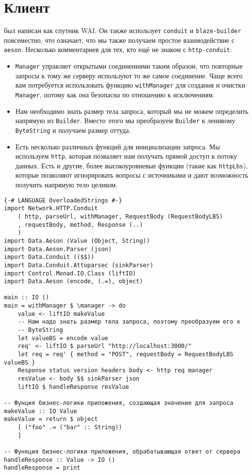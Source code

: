 \section {Клиент}

 был написан как спутник WAI. Он также использует \lstinline!conduit! и \lstinline!blaze-builder! повсеместно, что означает, что мы также получаем простое взаимодействие с \lstinline!aeson!. Несколько комментариев для тех, кто ещё не знаком с \lstinline!http-conduit!:

\begin{itemize}
  \item \lstinline!Manager! управляет открытыми соединениями таким образом, что повторные запросы к тому же серверу используют то же самое соединение. Чаще всего вам потребуется использовать функцию \lstinline!withManager! для создания и очистки \lstinline!Manager!, потому как она безопасна по отношению к исключениям.
  \item Нам необходимо знать размер тела запроса, который мы не можем определить напрямую из \lstinline!Builder!. Вместо этого мы преобразуем \lstinline!Builder! к ленивому \lstinline!ByteString! и получаем размер оттуда.
  \item Есть несколько различных функций для инициализации запроса. Мы используем \lstinline!http!, которая позваляет нам получать прямой доступ к потоку данных. Есть и другие, более высокоуровневые функции (такие как \lstinline!httpLbs!), которые позволяют игнорировать вопросы с источниками и дают возможность получить напрямую тело целиком.
\end{itemize}

\begin{lstlisting}
{-# LANGUAGE OverloadedStrings #-}
import Network.HTTP.Conduit
    ( http, parseUrl, withManager, RequestBody (RequestBodyLBS)
    , requestBody, method, Response (..)
    )
import Data.Aeson (Value (Object, String))
import Data.Aeson.Parser (json)
import Data.Conduit (($$))
import Data.Conduit.Attoparsec (sinkParser)
import Control.Monad.IO.Class (liftIO)
import Data.Aeson (encode, (.=), object)

main :: IO ()
main = withManager $ \manager -> do
    value <- liftIO makeValue
    -- Нам надо знать размер тела запроса, поэтому преобразуем его к
    -- ByteString
    let valueBS = encode value
    req' <- liftIO $ parseUrl "http://localhost:3000/"
    let req = req' { method = "POST", requestBody = RequestBodyLBS valueBS }
    Response status version headers body <- http req manager
    resValue <- body $$ sinkParser json
    liftIO $ handleResponse resValue

-- Фунция бизнес-логики приложения, создающая значение для запроса
makeValue :: IO Value
makeValue = return $ object
    [ ("foo" .= ("bar" :: String))
    ]

-- Функция бизнес-логики приложения, обрабатывающая ответ от сервера
handleResponse :: Value -> IO ()
handleResponse = print
\end{lstlisting}
